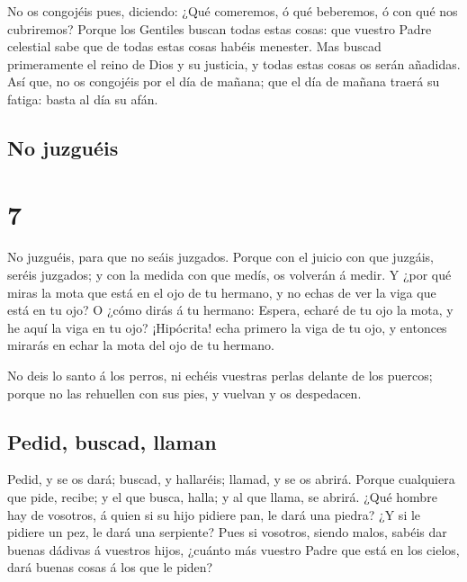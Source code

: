  No os congojéis pues, diciendo: ¿Qué comeremos, ó qué
beberemos, ó con qué nos cubriremos?  Porque los Gentiles
buscan todas estas cosas: que vuestro Padre celestial sabe que de todas
estas cosas habéis menester.  Mas buscad primeramente el
reino de Dios y su justicia, y todas estas cosas os serán añadidas.
 Así que, no os congojéis por el día de mañana; que el
día de mañana traerá su fatiga: basta al día su afán.

\hypertarget{no-juzguuxe9is}{%
\subsection{No juzguéis}\label{no-juzguuxe9is}}

\hypertarget{section-6}{%
\section{7}\label{section-6}}

 No juzguéis, para que no seáis juzgados. 
Porque con el juicio con que juzgáis, seréis juzgados; y con la medida
con que medís, os volverán á medir.  Y ¿por qué miras la
mota que está en el ojo de tu hermano, y no echas de ver la viga que
está en tu ojo?  O ¿cómo dirás á tu hermano: Espera,
echaré de tu ojo la mota, y he aquí la viga en tu ojo? 
¡Hipócrita! echa primero la viga de tu ojo, y entonces mirarás en echar
la mota del ojo de tu hermano.

 No deis lo santo á los perros, ni echéis vuestras perlas
delante de los puercos; porque no las rehuellen con sus pies, y vuelvan
y os despedacen.

\hypertarget{pedid-buscad-llaman}{%
\subsection{Pedid, buscad, llaman}\label{pedid-buscad-llaman}}

 Pedid, y se os dará; buscad, y hallaréis; llamad, y se os
abrirá.  Porque cualquiera que pide, recibe; y el que
busca, halla; y al que llama, se abrirá.  ¿Qué hombre hay
de vosotros, á quien si su hijo pidiere pan, le dará una piedra?
 ¿Y si le pidiere un pez, le dará una serpiente?
 Pues si vosotros, siendo malos, sabéis dar buenas
dádivas á vuestros hijos, ¿cuánto más vuestro Padre que está en los
cielos, dará buenas cosas á los que le piden?

